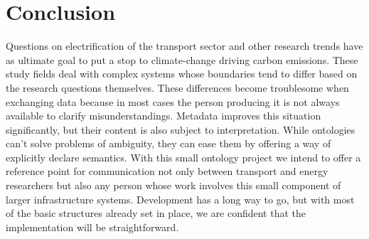 ﻿\section{Conclusion}
\label{conclusion}

Questions on electrification of the transport sector and other research trends
have as ultimate goal to put a stop to climate-change driving carbon emissions.
These study fields deal with complex systems whose boundaries tend to differ
based on the research questions themselves. These differences become
troublesome when exchanging data because in most cases the person producing it
is not always available to clarify misunderstandings. Metadata improves this
situation significantly, but their content is also subject to interpretation.
While ontologies can't solve problems of ambiguity, they can ease them by
offering a way of explicitly declare semantics. With this small ontology
project we intend to offer a reference point for communication not only between
transport and energy researchers but also any person whose work involves this
small component of larger infrastructure systems. Development has a long way to
go, but with most of the basic structures already set in place, we are
confident that the implementation will be straightforward.